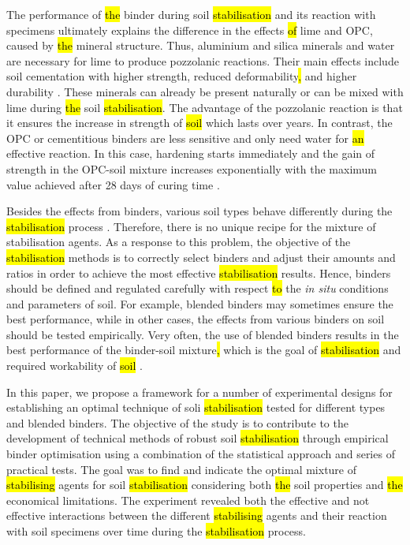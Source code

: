 \documentclass[eprint,
]{actapoly}
\begin{document}
The performance of \hl{the} binder during soil \hl{stabilisation} and its reaction with specimens ultimately explains the difference in the effects \hl{of} lime and OPC, caused by \hl{the} mineral structure. Thus, aluminium and silica minerals and water are necessary for lime to produce pozzolanic reactions. Their main effects include soil cementation with\hl{ }higher strength, reduced deformability\hl{,} and higher durability \citep{DISANTE2022100742,AkulaLittle,1988240,VITALE201736}. These minerals can already be present naturally or can be mixed with lime during \hl{the} soil \hl{stabilisation}. The advantage of the pozzolanic reaction is that it ensures the increase in strength of \hl{soil} which lasts over years. In contrast, the OPC or cementitious binders are less sensitive and only need water for \hl{an} effective reaction. In this case, hardening starts immediately and the gain of strength in the OPC-soil mixture increases exponentially with the maximum value achieved after 28 days of curing time \citep{Bell1995,Makusa}. 

Besides the effects from binders, various soil types behave differently during the \hl{stabilisation} process \citep{BhattacharjaBhatty,Burroughs2008,Renjithetal2020,VENDAOLIVEIRA2018336,Wall}. Therefore, there is no unique recipe for the mixture of stabilisation agents. As a response to this problem, the objective of the \hl{stabilisation} methods is to correctly select binders and adjust their amounts and ratios in order to achieve the most effective \hl{stabilisation} results. Hence, binders should be defined and regulated carefully with respect \hl{to} the \emph{in situ} conditions and parameters of soil. For example, blended binders may sometimes ensure the best performance, while in other cases, the effects from various binders on soil should be tested empirically. Very often, the use of blended binders results in the best performance of the binder-soil mixture\hl{,} which is the goal of \hl{stabilisation} and required workability of \hl{soil} \citep{Schanz,Kangetal2019}. 

In this paper, we propose a framework for a number of\hl{ }experimental designs for establishing an optimal technique of soli \hl{stabilisation} tested for different types and blended binders. The objective of the study is to contribute to the development of technical methods of robust soil \hl{stabilisation} through empirical binder optimisation using a combination of the statistical approach and series of practical tests. The goal was to find and indicate the optimal mixture of \hl{stabilising} agents for soil \hl{stabilisation} considering both \hl{the} soil properties and \hl{the} economical limitations. The experiment revealed both the effective and not effective interactions between the different \hl{stabilising} agents and their reaction with soil specimens over time during the \hl{stabilisation} process. 
\end{document}

